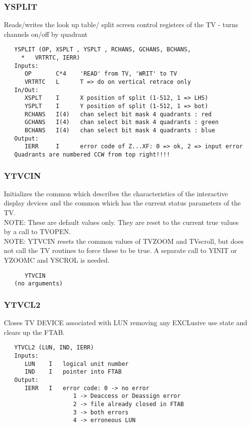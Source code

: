 \subsubsection{YSPLIT}
Reads/writes the look up table/ split screen control
registers of the TV - turns channels on/off by quadrant
\begin{verbatim}
   YSPLIT (OP, XSPLT , YSPLT , RCHANS, GCHANS, BCHANS,
     *   VRTRTC, IERR)
   Inputs:
      OP       C*4    'READ' from TV, 'WRIT' to TV
      VRTRTC   L      T => do on vertical retrace only
   In/Out:
      XSPLT    I      X position of split (1-512, 1 => LHS)
      YSPLT    I      Y position of split (1-512, 1 => bot)
      RCHANS   I(4)   chan select bit mask 4 quadrants : red
      GCHANS   I(4)   chan select bit mask 4 quadrants : green
      BCHANS   I(4)   chan select bit mask 4 quadrants : blue
   Output:
      IERR     I      error code of Z...XF: 0 => ok, 2 => input error
   Quadrants are numbered CCW from top right!!!!

\end{verbatim}

\subsubsection{YTVCIN}
Initializes the common which describes the characteristics of the
interactive display devices and the common which has the current
status parameters of the TV.\\
NOTE: These are default values only. They are reset to the current
true values by a call to TVOPEN.\\
NOTE: YTVCIN resets the common values of TVZOOM and TVscroll, but does
not call the TV routines to force these to be true.  A separate call
to YINIT or YZOOMC and YSCROL is needed.

\begin{verbatim}
      YTVCIN
   (no arguments)
\end{verbatim}

\subsubsection{YTVCL2}
Closes TV DEVICE associated with LUN removing any EXCLusive
use state and clears up the FTAB.
\begin{verbatim}
   YTVCL2 (LUN, IND, IERR)
   Inputs:
      LUN    I   logical unit number
      IND    I   pointer into FTAB
   Output:
      IERR   I   error code: 0 -> no error
                    1 -> Deaccess or Deassign error
                    2 -> file already closed in FTAB
                    3 -> both errors
                    4 -> erroneous LUN

\end{verbatim}

